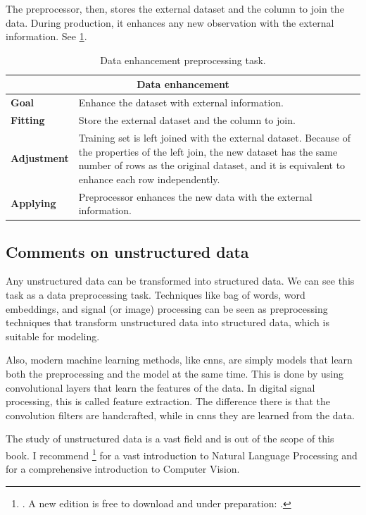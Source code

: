 The preprocessor, then, stores the external dataset and the column to join the data.
During production, it enhances any new observation with the external information.  See
\cref{tab:data-enhancement}.

\begin{table}\caption{Data enhancement preprocessing task.}
  \centering
  \begin{tabular}{lp{6cm}}
    \toprule
    \multicolumn{2}{c}{\textbf{Data enhancement}} \\
    \midrule
    \textbf{Goal} &
      Enhance the dataset with external information. \\
    \textbf{Fitting} &
      Store the external dataset and the column to join. \\
    \textbf{Adjustment} &
      Training set is left joined with the external dataset.  Because of the properties of
      the left join, the new dataset has the same number of rows as the original dataset,
      and it is equivalent to enhance each row independently.  \\
    \textbf{Applying} &
      Preprocessor enhances the new data with the external information. \\
    \bottomrule
  \end{tabular}
  \label{tab:data-enhancement}
\end{table}

\subsection{Comments on unstructured data}

Any unstructured data can be transformed into structured data.  We can see this task as a
data preprocessing task.  Techniques like bag of words, word embeddings, and signal (or
image) processing can be seen as preprocessing techniques that transform unstructured data
into structured data, which is suitable for modeling.

Also, modern machine learning methods, like \glspl{cnn}, are simply models that learn both
the preprocessing and the model at the same time.  This is done by using convolutional
layers that learn the features of the data.  In digital signal processing, this is called
feature extraction.  The difference there is that the convolution filters are handcrafted,
while in \glspl{cnn} they are learned from the data.

The study of unstructured data is a vast field and is out of the scope of this book.  I
recommend \textcite{Jurafsky2008}\footnote{. A new edition is
free to download and under preparation: .} for a vast
introduction to Natural Language Processing and
\textcite{Szeliski2022} for a comprehensive introduction to
Computer Vision.

